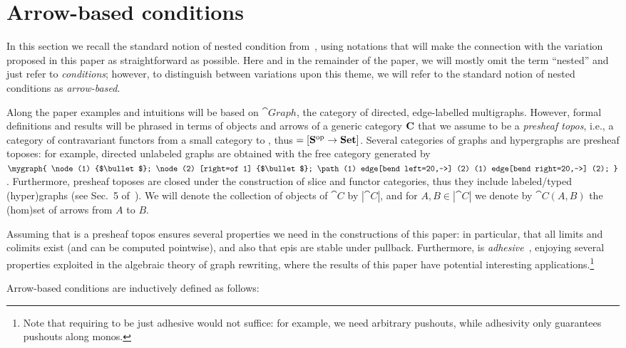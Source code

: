 \section{Arrow-based conditions}

In this section we recall the standard notion of nested condition from~\cite{Rensink-FOL}, using notations that will make the connection with the variation proposed in this paper as straightforward as possible. Here and in the remainder of the paper, we will mostly omit the term ``nested'' and just refer to \emph{conditions}; however, to distinguish between variations upon this theme, we will refer to the standard notion of nested conditions as \emph{arrow-based}.

Along the paper examples and intuitions will be based on $\cat{Graph}$, the category of directed, edge-labelled multigraphs. However, formal definitions and results will be phrased in terms of objects and arrows of a generic category $\mathbf{C}$ that we assume to be a \emph{presheaf topos}, i.e., a category of contravariant functors from a small category  to , thus  $= [{\mathbf{S}}^{\mathrm{op}} \rightarrow \mathbf{Set}]$. Several categories of graphs and hypergraphs are presheaf toposes: for example, directed unlabeled graphs are obtained with  the free category generated by $\mygraph{
  \node (1) {$\bullet$};
  \node (2) [right=of 1] {$\bullet$};
  \path (1) edge[bend left=20,->] (2)
        (1) edge[bend right=20,->] (2);
}$. Furthermore, presheaf toposes are closed under the construction of slice and functor categories, thus they include labeled/typed (hyper)graphs (see Sec.~5 of~\cite{AzziCR19}). We will denote the collection of objects of $\cat{C}$ by $|\cat{C}|$, and for $A,B \in |\cat{C}|$ we denote by $\cat{C}(A,B)$ the (hom)set of arrows from $A$ to $B$.  

Assuming that  is a presheaf topos ensures several properties we need in the constructions of this paper: in particular, that all limits and colimits exist (and can be computed pointwise), and also that epis are stable under pullback. Furthermore,  is \emph{adhesive}~\cite{ls:adhesive-journal}, enjoying several properties exploited in the algebraic theory of graph rewriting, where the results of this paper have potential interesting applications.\footnote{Note that requiring  to be just adhesive would not suffice: for example, we need arbitrary pushouts, while adhesivity only guarantees pushouts along monos.}

\medskip\noindent
Arrow-based conditions are inductively defined as follows:

